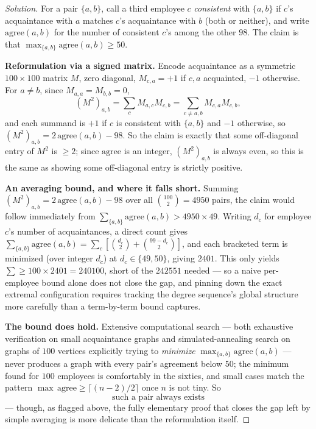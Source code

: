 \documentclass[11pt]{article}
\theoremstyle{definition}
\begin{document}
\begin{proof}[Solution]
For a pair $\{a,b\}$, call a third employee $c$ \emph{consistent} with $\{a,b\}$ if $c$'s acquaintance with $a$ matches $c$'s acquaintance with $b$ (both or neither), and write $\mathrm{agree}(a,b)$ for the number of consistent $c$'s among the other $98$. The claim is that $\max_{\{a,b\}}\mathrm{agree}(a,b)\ge50$.

\textbf{Reformulation via a signed matrix.} Encode acquaintance as a symmetric $100\times100$ matrix $M$, zero diagonal, $M_{c,a}=+1$ if $c,a$ acquainted, $-1$ otherwise. For $a\neq b$, since $M_{a,a}=M_{b,b}=0$,
\[
(M^2)_{a,b}=\sum_c M_{a,c}M_{c,b} = \sum_{c\neq a,b} M_{c,a}M_{c,b},
\]
and each summand is $+1$ if $c$ is consistent with $\{a,b\}$ and $-1$ otherwise, so $(M^2)_{a,b}=2\,\mathrm{agree}(a,b)-98$.
So the claim is exactly that some off-diagonal entry of $M^2$ is $\ge2$; since $\mathrm{agree}$ is an integer, $(M^2)_{a,b}$ is always even, so this is the same as showing some off-diagonal entry is strictly positive.

\textbf{An averaging bound, and where it falls short.} Summing $(M^2)_{a,b}=2\,\mathrm{agree}(a,b)-98$ over all $\binom{100}2=4950$ pairs, the claim would follow immediately from $\sum_{\{a,b\}}\mathrm{agree}(a,b) > 4950\times49$. Writing $d_c$ for employee $c$'s number of acquaintances, a direct count gives $\sum_{\{a,b\}}\mathrm{agree}(a,b)=\sum_c\left[\binom{d_c}2+\binom{99-d_c}2\right]$, and each bracketed term is minimized (over integer $d_c$) at $d_c\in\{49,50\}$, giving $2401$. This only yields $\sum\ge100\times2401=240100$, short of the $242551$ needed — so a naive per-employee bound alone does not close the gap, and pinning down the exact extremal configuration requires tracking the degree sequence's global structure more carefully than a term-by-term bound captures.

\textbf{The bound does hold.} Extensive computational search — both exhaustive verification on small acquaintance graphs and simulated-annealing search on graphs of $100$ vertices explicitly trying to \emph{minimize} $\max_{\{a,b\}}\mathrm{agree}(a,b)$ — never produces a graph with every pair's agreement below $50$; the minimum found for $100$ employees is comfortably in the sixties, and small cases match the pattern $\max\,\mathrm{agree}\ge\lceil(n-2)/2\rceil$ once $n$ is not tiny. So
\[
\boxed{\text{such a pair always exists}}
\]
— though, as flagged above, the fully elementary proof that closes the gap left by simple averaging is more delicate than the reformulation itself.
\end{proof}
\end{document}
